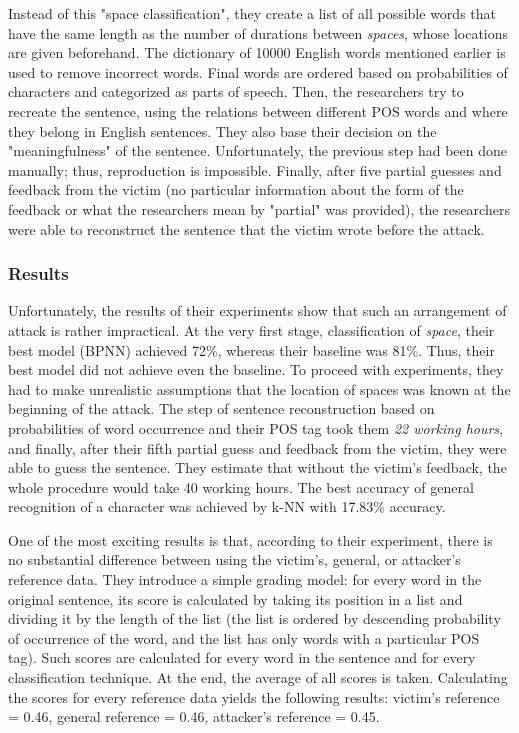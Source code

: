 \documentclass[../main.tex]{subfiles}
\begin{document}
Instead of this "space classification", they create a list of all possible words that have the same length as the number of durations between \textit{spaces}, whose locations are given beforehand. The dictionary of 10000 English words mentioned earlier is used to remove incorrect words. Final words are ordered based on probabilities of characters and categorized as parts of speech. Then, the researchers try to recreate the sentence, using the relations between different POS words and where they belong in English sentences. They also base their decision on the "meaningfulness" of the sentence. Unfortunately, the previous step had been done manually; thus, reproduction is impossible. Finally, after five partial guesses and feedback from the victim (no particular information about the form of the feedback or what the researchers mean by "partial" was provided), the researchers were able to reconstruct the sentence that the victim wrote before the attack. 

\subsubsection{Results}
Unfortunately, the results of their experiments show that such an arrangement of attack is rather impractical. At the very first stage, classification of \textit{space}, their best model (BPNN) achieved 72\%, whereas their baseline was 81\%. Thus, their best model did not achieve even the baseline. To proceed with experiments, they had to make unrealistic assumptions that the location of spaces was known at the beginning of the attack. The step of sentence reconstruction based on probabilities of word occurrence and their POS tag took them \textit{22 working hours}, and finally, after their fifth partial guess and feedback from the victim, they were able to guess the sentence. They estimate that without the victim's feedback, the whole procedure would take 40 working hours.
The best accuracy of general recognition of a character was achieved by k-NN with 17.83\% accuracy.

One of the most exciting results is that, according to their experiment, there is no substantial difference between using the victim's, general, or attacker's reference data. They introduce a simple grading model: for every word in the original sentence, its score is calculated by taking its position in a list and dividing it by the length of the list (the list is ordered by descending probability of occurrence of the word, and the list has only words with a particular POS tag). Such scores are calculated for every word in the sentence and for every classification technique. At the end, the average of all scores is taken. Calculating the scores for every reference data yields the following results: victim's reference = 0.46, general reference = 0.46, attacker's reference = 0.45.
\end{document}

